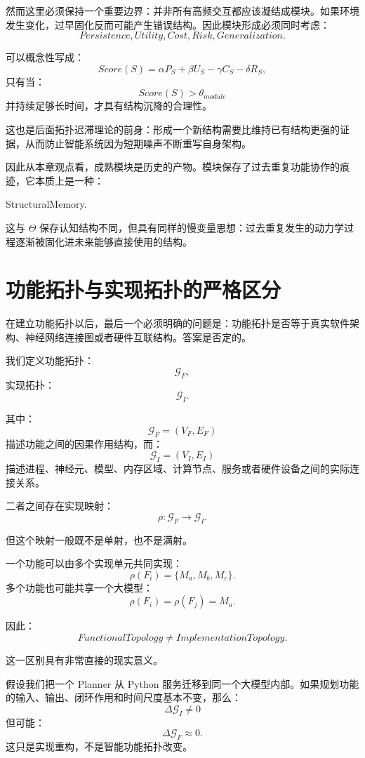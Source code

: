 然而这里必须保持一个重要边界：并非所有高频交互都应该凝结成模块。如果环境发生变化，过早固化反而可能产生错误结构。因此模块形成必须同时考虑：
\[
Persistence,
Utility,
Cost,
Risk,
Generalization.
\]

可以概念性写成：
\[
Score(S)
=
\alpha P_S
+
\beta U_S
-
\gamma C_S
-
\delta R_S,
\]
只有当：
\[
Score(S)>\theta_{module}
\]
并持续足够长时间，才具有结构沉降的合理性。

这也是后面拓扑迟滞理论的前身：形成一个新结构需要比维持已有结构更强的证据，从而防止智能系统因为短期噪声不断重写自身架构。

因此从本章观点看，成熟模块是历史的产物。模块保存了过去重复功能协作的痕迹，它本质上是一种：
\begin{statementbox}
StructuralMemory.
\end{statementbox}

这与 $\Theta$ 保存认知结构不同，但具有同样的慢变量思想：过去重复发生的动力学过程逐渐被固化进未来能够直接使用的结构。


\section{功能拓扑与实现拓扑的严格区分}

在建立功能拓扑以后，最后一个必须明确的问题是：功能拓扑是否等于真实软件架构、神经网络连接图或者硬件互联结构。答案是否定的。

我们定义功能拓扑：
\[
\mathcal G_F,
\]
实现拓扑：
\[
\mathcal G_I.
\]

其中：
\[
\mathcal G_F
=
(V_F,E_F)
\]
描述功能之间的因果作用结构，而：
\[
\mathcal G_I
=
(V_I,E_I)
\]
描述进程、神经元、模型、内存区域、计算节点、服务或者硬件设备之间的实际连接关系。

二者之间存在实现映射：
\[
\rho:
\mathcal G_F
\rightarrow
\mathcal G_I.
\]

但这个映射一般既不是单射，也不是满射。

一个功能可以由多个实现单元共同实现：
\[
\rho(F_i)
=
\{M_a,M_b,M_c\}.
\]
多个功能也可能共享一个大模型：
\[
\rho(F_i)
=
\rho(F_j)
=
M_a.
\]

因此：
\[
\boxed{
FunctionalTopology
\neq
ImplementationTopology.
}
\]

这一区别具有非常直接的现实意义。

假设我们把一个 Planner 从 Python 服务迁移到同一个大模型内部。如果规划功能的输入、输出、闭环作用和时间尺度基本不变，那么：
\[
\Delta\mathcal G_I\neq0
\]
但可能：
\[
\Delta\mathcal G_F\approx0.
\]
这只是实现重构，不是智能功能拓扑改变。

